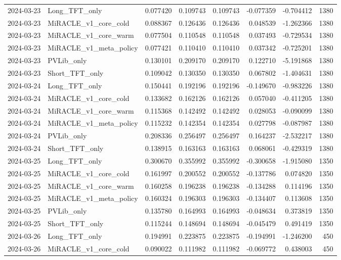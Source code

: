 \begin{tabular}{llrrrrrr}
2024-03-23 & Long_TFT_only & 0.077420 & 0.109743 & 0.109743 & -0.077359 & -0.704412 & 1380 \\
2024-03-23 & MiRACLE_v1_core_cold & 0.088367 & 0.126436 & 0.126436 & 0.048539 & -1.262366 & 1380 \\
2024-03-23 & MiRACLE_v1_core_warm & 0.077504 & 0.110548 & 0.110548 & 0.037493 & -0.729534 & 1380 \\
2024-03-23 & MiRACLE_v1_meta_policy & 0.077421 & 0.110410 & 0.110410 & 0.037342 & -0.725201 & 1380 \\
2024-03-23 & PVLib_only & 0.130101 & 0.209170 & 0.209170 & 0.122710 & -5.191868 & 1380 \\
2024-03-23 & Short_TFT_only & 0.109042 & 0.130350 & 0.130350 & 0.067802 & -1.404631 & 1380 \\
2024-03-24 & Long_TFT_only & 0.150441 & 0.192196 & 0.192196 & -0.149670 & -0.983226 & 1380 \\
2024-03-24 & MiRACLE_v1_core_cold & 0.133682 & 0.162126 & 0.162126 & 0.057040 & -0.411205 & 1380 \\
2024-03-24 & MiRACLE_v1_core_warm & 0.115368 & 0.142492 & 0.142492 & 0.028053 & -0.090099 & 1380 \\
2024-03-24 & MiRACLE_v1_meta_policy & 0.115232 & 0.142354 & 0.142354 & 0.027798 & -0.087987 & 1380 \\
2024-03-24 & PVLib_only & 0.208336 & 0.256497 & 0.256497 & 0.164237 & -2.532217 & 1380 \\
2024-03-24 & Short_TFT_only & 0.138915 & 0.163163 & 0.163163 & 0.068061 & -0.429319 & 1380 \\
2024-03-25 & Long_TFT_only & 0.300670 & 0.355992 & 0.355992 & -0.300658 & -1.915080 & 1350 \\
2024-03-25 & MiRACLE_v1_core_cold & 0.161997 & 0.200552 & 0.200552 & -0.137786 & 0.074820 & 1350 \\
2024-03-25 & MiRACLE_v1_core_warm & 0.160258 & 0.196238 & 0.196238 & -0.134288 & 0.114196 & 1350 \\
2024-03-25 & MiRACLE_v1_meta_policy & 0.160324 & 0.196303 & 0.196303 & -0.134407 & 0.113608 & 1350 \\
2024-03-25 & PVLib_only & 0.135780 & 0.164993 & 0.164993 & -0.048634 & 0.373819 & 1350 \\
2024-03-25 & Short_TFT_only & 0.115244 & 0.148694 & 0.148694 & -0.045479 & 0.491419 & 1350 \\
2024-03-26 & Long_TFT_only & 0.194991 & 0.223875 & 0.223875 & -0.194991 & -1.246200 & 450 \\
2024-03-26 & MiRACLE_v1_core_cold & 0.090022 & 0.111982 & 0.111982 & -0.069772 & 0.438003 & 450 \\

\end{tabular}
